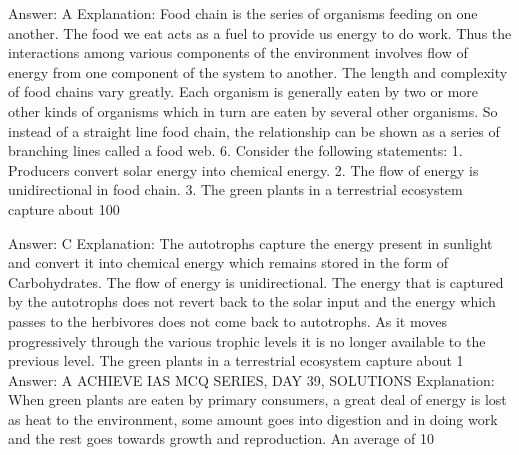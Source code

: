Answer: A
Explanation: Food chain is the series of organisms feeding on one another. The food we eat acts as a fuel to provide us energy to do work. Thus the interactions among various components of the environment involves flow of energy from one component of the system to another. The length and complexity of food chains vary greatly. Each organism is generally eaten by two or more other kinds of organisms which in turn are eaten by several other organisms. So instead of a straight line food chain, the relationship can be shown as a series of branching lines called a food web. 6. Consider the following statements: 1. Producers convert solar energy into chemical energy. 2. The flow of energy is unidirectional in food chain. 3. The green plants in a terrestrial ecosystem capture about 100%

Answer: C
Explanation: The autotrophs capture the energy present in sunlight and convert it into chemical energy which remains stored in the form of Carbohydrates. The flow of energy is unidirectional. The energy that is captured by the autotrophs does not revert back to the solar input and the energy which passes to the herbivores does not come back to autotrophs. As it moves progressively through the various trophic levels it is no longer available to the previous level. The green plants in a terrestrial ecosystem capture about 1%
Answer: A ACHIEVE IAS MCQ SERIES, DAY 
39, SOLUTIONS
Explanation: When green plants are eaten by primary consumers, a great deal of energy is lost as heat to the environment, some amount goes into digestion and in doing work and the rest goes towards growth and reproduction. An average of 10%

